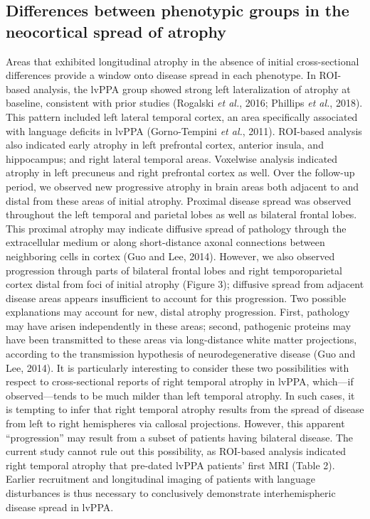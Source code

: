 \documentclass[]{article}
\begin{document}
\subsection*{Differences between phenotypic groups in the neocortical
spread of
atrophy}\label{differences-between-phenotypic-groups-in-the-neocortical-spread-of-atrophy}

Areas that exhibited longitudinal atrophy in the absence of initial
cross-sectional differences provide a window onto disease spread in each
phenotype. In ROI-based analysis, the lvPPA group showed strong left
lateralization of atrophy at baseline, consistent with prior studies
(Rogalski \emph{et al.}, 2016; Phillips \emph{et al.}, 2018). This
pattern included left lateral temporal cortex, an area specifically
associated with language deficits in lvPPA (Gorno-Tempini \emph{et al.},
2011). ROI-based analysis also indicated early atrophy in left
prefrontal cortex, anterior insula, and hippocampus; and right lateral
temporal areas. Voxelwise analysis indicated atrophy in left precuneus
and right prefrontal cortex as well. Over the follow-up period, we
observed new progressive atrophy in brain areas both adjacent to and
distal from these areas of initial atrophy. Proximal disease spread was
observed throughout the left temporal and parietal lobes as well as
bilateral frontal lobes. This proximal atrophy may indicate diffusive
spread of pathology through the extracellular medium or along
short-distance axonal connections between neighboring cells in cortex
(Guo and Lee, 2014). However, we also observed progression through parts
of bilateral frontal lobes and right temporoparietal cortex distal from
foci of initial atrophy (Figure 3); diffusive spread from adjacent
disease areas appears insufficient to account for this progression. Two
possible explanations may account for new, distal atrophy progression.
First, pathology may have arisen independently in these areas; second,
pathogenic proteins may have been transmitted to these areas via
long-distance white matter projections, according to the transmission
hypothesis of neurodegenerative disease (Guo and Lee, 2014). It is
particularly interesting to consider these two possibilities with
respect to cross-sectional reports of right temporal atrophy in lvPPA,
which---if observed---tends to be much milder than left temporal
atrophy. In such cases, it is tempting to infer that right temporal
atrophy results from the spread of disease from left to right
hemispheres via callosal projections. However, this apparent
``progression'' may result from a subset of patients having bilateral
disease. The current study cannot rule out this possibility, as
ROI-based analysis indicated right temporal atrophy that pre-dated lvPPA
patients' first MRI (Table 2). Earlier recruitment and longitudinal
imaging of patients with language disturbances is thus necessary to
conclusively demonstrate interhemispheric disease spread in lvPPA.
\end{document}
